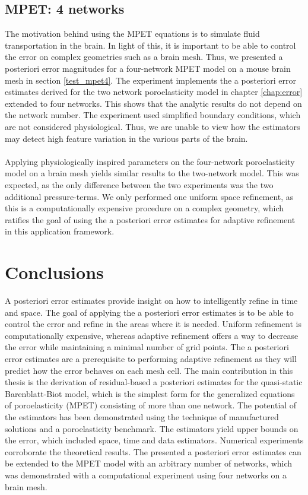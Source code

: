 \subsection{MPET: 4 networks}
The motivation behind using the MPET equations is to simulate fluid transportation in the brain. In light of this, it is important to be able to control the error on complex geometries such as a brain mesh. Thus, we presented a posteriori error magnitudes for a four-network MPET model on a mouse brain mesh in section \ref{test_mpet4}. The experiment implements the a posteriori error estimates derived for the two network poroelasticity model in chapter \ref{chap:error} extended to four networks. This shows that the analytic results do not depend on the network number. The experiment used simplified boundary conditions, which are not considered physiological. Thus, we are unable to view how the estimators may detect high feature variation in the various parts of the brain. 
\\
\\
Applying physiologically inspired parameters on the four-network poroelasticity model on a brain mesh yields similar results to the two-network model. This was expected, as the only difference between the two experiments was the two additional pressure-terms. We only performed one uniform space refinement, as this is a computationally expensive procedure on a complex geometry, which ratifies the goal of using the a posteriori error estimates for adaptive refinement in this application framework.


\section{Conclusions} \label{section:conclusion}
A posteriori error estimates provide insight on how to intelligently refine in time and space. The goal of applying the a posteriori error estimates is to be able to control the error and refine in the areas where it is needed. Uniform refinement is computationally expensive, whereas adaptive refinement offers a way to decrease the error while maintaining a minimal number of grid points. The a posteriori error estimates are a prerequisite to performing adaptive refinement as they will predict how the error behaves on each mesh cell. The main contribution in this thesis is the derivation of residual-based a posteriori estimates for the quasi-static Barenblatt-Biot model, which is the simplest form for the generalized equations of poroelasticity (MPET) consisting of more than one network. The potential of the estimators has been demonstrated using the technique of manufactured solutions and a poroelasticity benchmark. The estimators yield upper bounds on the error, which included space, time and data estimators. Numerical experiments corroborate the theoretical results. The presented a posteriori error estimates can be extended to the MPET model with an arbitrary number of networks, which was demonstrated with a computational experiment using four networks on a brain mesh.

